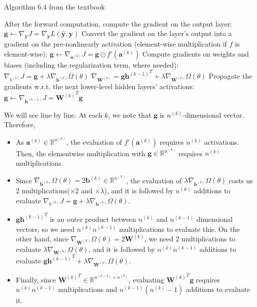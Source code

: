 \documentclass[
	12pt, %
]{../Template/fphw}
\renewcommand{\b}{\mathbf{b}}
\newcommand{\y}{\mathbf{y}}
\newcommand{\h}{\mathbf{h}}
\renewcommand{\a}{\mathbf{a}}
\newcommand{\W}{\mathbf{W}}
\newcommand{\g}{\mathbf{g}}
\begin{document}
\begin{enumerate}[label=(\arabic*)]
\begin{algorithm}
    \caption{Algorithm 6.4 from the textbook}\label{alg:6.4}
    \begin{algorithmic}
        \State After the forward computation, compute the gradient on the output layer:
        \State $\g \leftarrow \nabla_{\hat{\y}} J = \nabla_{\y}L(\hat{\y},\y)$
        \State Convert the gradient on the layer's output into a gradient on the pre-nonlinearly activation (element-wise multiplication if $f$ is element-wise):
        \State $\g \leftarrow \nabla_{\a^{(k)}}J = \g\odot f'(\a^{(k)})$
        \State Compute gradients on weights and biases (including the regularization term, where needed):
        \State $\nabla_{b^{(k)}} J = \g + \lambda \nabla_{\b^{(k)}} \Omega (\theta)$ 
        \State $\nabla_{\W^{(k)}} = \g {\h^{(k-1)}}^T + \lambda \nabla_{\W^{(k)}}\Omega (\theta)$
        \State Propagate the gradients w.r.t. the next lower-level hidden layers' activations:
        \State $\g\leftarrow \nabla_{\h^{(k-1)}}J = {\W^{(k)}}^{T} \g$
        \EndFor
    \end{algorithmic}
\end{algorithm}
 We will see line by line. At each $k$, we note that $\g$ is $n^{(k)}$-dimensional vector. Therefore,
\begin{itemize}
    \item As $\a^{(k)}\in \mathbb{R}^{n^{(k)}}$, the evaluation of $f'(\a^{(k)})$ requires $n^{(k)}$ activations. Then, the elementwise multiplication with $\g \in \mathbb{R}^{n^{(k)}}$ requires $n^{(k)}$ multiplications. 
    \item Since $\nabla_{\b^{(k)}}\Omega (\theta) = 2\b^{(k)}\in \mathbb{R}^{n^{(k)}}$, the evaluation of $\lambda \nabla_{\b^{(k)}} \Omega (\theta)$ costs us 2 multiplications($\times 2$ and $\times \lambda$), and it is followed by $n^{(k)}$ additions to evaluate $\nabla_{b^{(k)}} J = \g + \lambda \nabla_{\b^{(k)}} \Omega (\theta)$.
    \item $\g {\h^{(k-1)}}^T$ is an outer product between $n^{(k)}$ and $n^{(k-1)}$ dimensional vectors, so we need $n^{(k)}n^{(k-1)}$ multiplications to evaluate this. On the other hand, since $\nabla_{\W^{(k)}}\Omega (\theta) = 2 \W^{(k)}$, we need $2$ multiplications to evaluate $\lambda \nabla_{\W^{(k)}}\Omega (\theta)$, and it is followed by $n^{(k)}n^{(k-1)}$ additions to evaluate $\g {\h^{(k-1)}}^T + \lambda \nabla_{\W^{(k)}}\Omega (\theta)$.
    \item Finally, since ${\W^{(k)}}^T\in \mathbb{R}^{n^{(k-1)}\times n^{(k)}}$, evaluating ${\W^{(k)}}^{T} \g$ requires $n^{(k)}n^{(k-1)}$ multiplications and $n^{(k-1)}(n^{(k)}-1)$ additions to evaluate it.

\end{itemize}
\end{enumerate}
\end{document}
